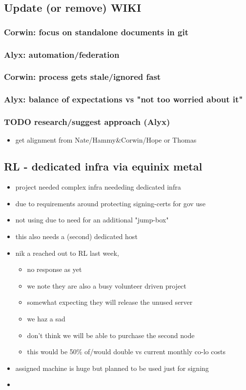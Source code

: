 \documentclass[11pt]{article}
\begin{document}
\subsection{Update (or remove) WIKI}
\label{sec:orge015502}
\subsubsection{Corwin: focus on standalone documents in git}
\label{sec:org9d24136}
\subsubsection{Alyx: automation/federation}
\label{sec:orgfe34016}
\subsubsection{Corwin: process gets stale/ignored fast}
\label{sec:org85b3b26}
\subsubsection{Alyx: balance of expectations vs "not too worried about it"}
\label{sec:org282dbaa}
\subsubsection{{\bfseries\sffamily TODO} research/suggest approach (Alyx)}
\label{sec:org4a0f003}
\begin{itemize}
\item get alignment from Nate/Hammy\&Corwin/Hope or Thomas
\end{itemize}
\subsection{RL - dedicated infra via equinix metal}
\label{sec:org68576db}
\begin{itemize}
\item project needed complex infra neededing dedicated infra
\item due to requirements around protecting signing-certs for gov use
\item not using due to need for an additional "jump-box"
\item this also needs a (second) dedicated host
\item nik a reached out to RL last week,
\begin{itemize}
\item no response as yet
\item we note they are also a busy volunteer driven project
\item somewhat expecting they will release the unused server
\item we haz a sad
\item don't think we will be able to purchase the second node
\item this would be 50\% of/would double vs current monthly co-lo costs
\end{itemize}
\item assigned machine is huge but planned to be used just for signing
\item 
\end{itemize}
\end{document}
